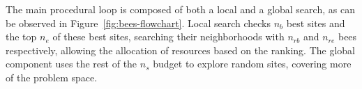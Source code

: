 \documentclass[12pt,a4paper]{article}
\begin{document}
The main procedural loop is composed of both a local and a global search, as can be observed in Figure~\ref{fig:bees-flowchart}. 
Local search checks $n_b$ best sites and the top $n_e$ of these best sites, searching their neighborhoods with $n_{rb}$ and $n_{re}$ bees respectively, allowing the allocation of resources based on the ranking.
The global component uses the rest of the $n_s$ budget to explore random sites, covering more of the problem space.

\vfill





\newpage
\printbibliography
\end{document}
